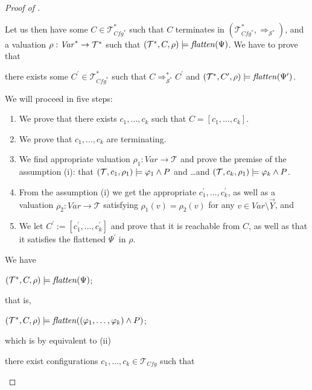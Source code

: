 \begin{proof}[Proof of ]
\begin{enumerate}
    Let us then have some $C \in \mathcal{T}^*_{\mathit{Cfg}^*}$
    such that $C$ terminates in $(\mathcal{T}^*_{\mathit{Cfg}^*}, \Rightarrow_{\mathcal{S}^*})$,
    and a valuation $\rho : \mathit{Var}^* \to \mathcal{T}^*$
    such that $(\mathcal{T}^*, C, \rho) \models \mathit{flatten}(\Psi)$.
    We have to prove that
    \begin{proofenv}
    there exists some $C^\prime \in \mathcal{T}^*_{\mathit{Cfg}^*}$
    such that
    $C \Rightarrow^{*}_{\mathcal{S}^*} C^\prime$
    and $(\mathcal{T}^*, C^\prime, \rho) \models \mathit{flatten}(\Psi^\prime)$.
    \end{proofenv}
    We will proceed in five steps:
    \begin{enumerate}
        \item \label{item:corr:step1} We prove that there exists $c_1,\ldots,c_k$ such that $C = [c_1,\ldots, c_k]$.
        \item \label{item:corr:step2} We prove that $c_1,\ldots,c_k$ are terminating.
        \item \label{item:corr:step3} We find appropriate valuation $\rho_1 : \mathit{Var} \to \mathcal{T}$
              and prove the premise of the assumption (i): that $(\mathcal{T}, c_1, \rho_1) \models \varphi_1 \land P$
        and \ldots and $(\mathcal{T}, c_k, \rho_1) \models \varphi_k \land P$.
        \item \label{item:corr:step4} From the assumption (i) we get the appropriate $c_1^\prime,\ldots,c_k^\prime$,
        as well as a valuation $\rho_2 : \mathit{Var} \to \mathcal{T}$ satisfying $\rho_1(v) = \rho_2(v)$ for any $v \in \mathit{Var} \setminus \vec{Y}$, and 
        \item \label{item:corr:step5} We let $C^\prime := [c_1^\prime,\ldots,c_k^\prime]$ and prove that it is reachable from $C$,
        as well as that it satisfies the flattened $\Psi^\prime$ in $\rho$.
    \end{enumerate}
    We have
    \begin{proofenv}
    $(\mathcal{T}^*, C, \rho) \models \mathit{flatten}(\Psi)$;
    \end{proofenv}
    that is,
    \begin{proofenv}
    $(\mathcal{T}^*, C, \rho) \models \mathit{flatten}((\varphi_1, \ldots, \varphi_k) \land P)$;
    \end{proofenv}
    which is by  equivalent to (ii)
    \begin{proofenv}
        there exist configurations $c_1, \ldots, c_k \in \mathcal{T}_{\mathit{Cfg}}$ such that

\end{proofenv}
\end{enumerate}
\end{proof}
